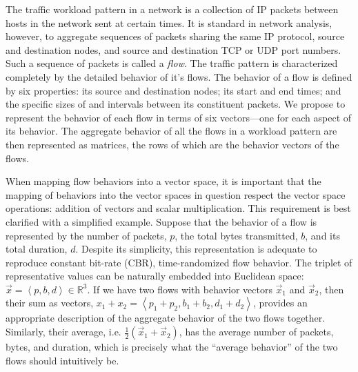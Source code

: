 \documentclass[conference]{IEEEtran}
\newcommand{\caps}[1]{{\small{#1}}}
\newcommand{\R}{\mathbb{R}}
\newcommand{\seq}[1]{\left<#1\right>}
\begin{document}
The traffic workload pattern in a network is a collection of \caps{IP} packets between hosts in the network sent at certain times. It is standard in network analysis, however, to aggregate sequences of packets sharing the same \caps{IP} protocol, source and destination nodes, and source and destination \caps{TCP} or \caps{UDP} port numbers. Such a sequence of packets is called a \textit{flow}. The traffic pattern is characterized completely by the detailed behavior of it's flows. The behavior of a flow is defined by six properties: its source and destination nodes; its start and end times; and the specific sizes of and intervals between its constituent packets. We propose to represent the behavior of each flow in terms of six vectors---one for each aspect of its behavior. The aggregate behavior of all the flows in a workload pattern are then represented as matrices, the rows of which are the behavior vectors of the flows.

When mapping flow behaviors into a vector space, it is important that the mapping of behaviors into the vector spaces in question respect the vector space operations: addition of vectors and scalar multiplication. This requirement is best clarified with a simplified example. Suppose that the behavior of a flow is represented by the number of packets, $p$, the total bytes transmitted, $b$, and its total duration, $d$. Despite its simplicity, this representation is adequate to reproduce constant bit-rate (\caps{CBR}), time-randomized flow behavior. The triplet of representative values can be naturally embedded into Euclidean space: $\vec{x}=\seq{p,b,d}\in\R^3$. If we have two flows with behavior vectors $\vec{x}_1$ and $\vec{x}_2$, then their sum as vectors, $x_1+x_2=\seq{p_1+p_2,b_1+b_2,d_1+d_2}$, provides an appropriate description of the aggregate behavior of the two flows together. Similarly, their average, i.e. $\frac{1}{2}(\vec{x}_1+\vec{x}_2)$, has the average number of packets, bytes, and duration, which is precisely what the ``average behavior'' of the two flows should intuitively be.

\end{document}
